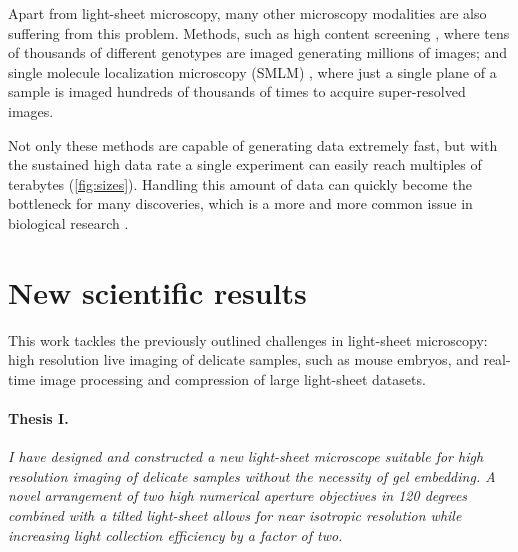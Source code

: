 \documentclass{booklet_style}
\begin{document}
Apart from light-sheet microscopy, many other microscopy modalities are also suffering from this problem. Methods, such as high content screening \cite{carpenter_systematic_2004,echeverri_high-throughput_2006,pepperkok_high-throughput_2006}, where tens of thousands of different genotypes are imaged generating millions of images; and single molecule localization microscopy (SMLM) \cite{betzig_imaging_2006,hess_ultra-high_2006,rust_sub-diffraction-limit_2006}, where just a single plane of a sample is imaged hundreds of thousands of times to acquire super-resolved images.

Not only these methods are capable of generating data extremely fast, but with the sustained high data rate a single experiment can easily reach multiples of terabytes (\autoref{fig:sizes}). Handling this amount of data can quickly become the bottleneck for many discoveries, which is a more and more common issue in biological research \cite{wollman_high_2007,reynaud_guide_2015,perkel_struggle_2016}. 








\section{New scientific results}

This work tackles the previously outlined challenges in light-sheet microscopy: high resolution live imaging of delicate samples, such as mouse embryos, and real-time image processing and compression of large light-sheet datasets.

  \paragraph{Thesis I.}\textit{I have designed and constructed a new light-sheet microscope suitable for high resolution imaging of delicate samples without the necessity of gel embedding. A novel arrangement of two high numerical aperture objectives in 120 degrees combined with a tilted light-sheet allows for near isotropic resolution while increasing light collection efficiency by a factor of two.}
  
\end{document}
